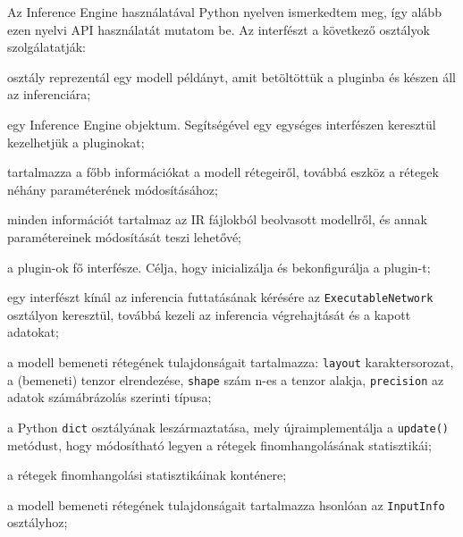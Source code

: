 Az Inference Engine használatával Python nyelven ismerkedtem meg, így alább ezen nyelvi API használatát mutatom be. Az interfészt a következő osztályok szolgálatatják:
\begin{description}[noitemsep]
	\item[\PVerb{ExecutableNetwork}] osztály reprezentál egy modell példányt, amit betöltöttük a pluginba és készen áll az inferenciára;
	\item[\PVerb{IECore}] egy Inference Engine objektum. Segítségével egy egységes interfészen keresztül kezelhetjük a pluginokat;
	\item[\PVerb{IENetLayer}] tartalmazza a főbb információkat a modell rétegeiről, továbbá eszköz a rétegek néhány paraméterének módosításához;
	\item[\PVerb{IENetwork}] minden információt tartalmaz az IR fájlokból beolvasott modellről, és annak paramétereinek módosítását teszi lehetővé;
	\item[\PVerb{IEPlugin}] a plugin-ok fő interfésze. Célja, hogy inicializálja és bekonfigurálja a plugin-t;
	\item[\PVerb{InferRequest}] egy interfészt kínál az inferencia futtatásának kérésére az  \verb|ExecutableNetwork| osztályon keresztül, továbbá kezeli az inferencia végrehajtását és a kapott adatokat;
	\item[\PVerb{InputInfo}] a modell bemeneti rétegének tulajdonságait tartalmazza: \verb|layout| karaktersorozat, a (bemeneti) tenzor elrendezése\footnotemark, \verb|shape| szám n-es a tenzor alakja, \verb|precision| az adatok számábrázolás szerinti típusa;
	\item[\PVerb{LayersStatsMap}] a Python \verb|dict| osztályának leszármaztatása, mely újraimplementálja a \verb|update()| metódust, hogy módosítható legyen a rétegek finomhangolásának statisztikái;
	\item[\PVerb{LayerStats}] a rétegek finomhangolási statisztikáinak konténere;
	\item[\PVerb{OutputInfo}] a modell bemeneti rétegének tulajdonságait tartalmazza hsonlóan az \verb|InputInfo| osztályhoz;
\end{description}

